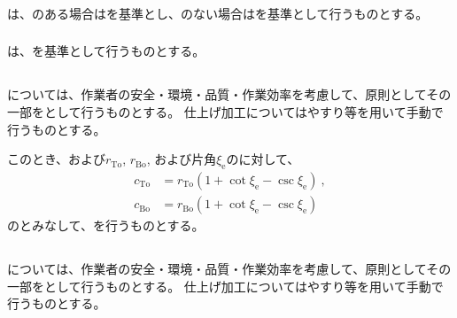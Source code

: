 \subsubsection{\EndFaceOutRChamferMillingReferencePoint}
\EndFaceOutRChamferMillingReferencePoint は、\Outcut のある場合は\OutcutCenter を基準とし、\Outcut のない場合は\EndFaceIDCenter を基準として行うものとする。

\subsubsection{\EndFaceInRChamferMilling}
\EndFaceInRChamferMillingReferencePoint は、\EndFaceIDCenter を基準として行うものとする。


\subsection{\EndFaceOutRChamferMilling}
\EndFaceOutRChamfer については、作業者の安全・環境・品質・作業効率を考慮して、原則としてその一部を\EndFaceOutCChamferMilling として行うものとする。
仕上げ加工についてはやすり等を用いて手動で行うものとする。

このとき、\TopEndFaceOutRChamferRadius および\BottomEndFaceOutRChamferRadius$r_\mathrm{To}$, $r_\mathrm{Bo}$, および片角$\xi_\mathrm e$の\TaperEndMill に対して、
\begin{align*}
  c_\mathrm{To} &= r_\mathrm{To}\left(1+\cot\xi_\mathrm e-\csc\xi_\mathrm e\right)\ ,\\
  c_\mathrm{Bo} &= r_\mathrm{Bo}\left(1+\cot\xi_\mathrm e-\csc\xi_\mathrm e\right)
\end{align*}
の\EndFaceOutCChamferLength とみなして、\EndFaceOutCChamferMilling を行うものとする。


\subsection{\EndFaceInRChamferMilling}
\EndFaceInRChamfer については、作業者の安全・環境・品質・作業効率を考慮して、原則としてその一部を\EndFaceInCChamferMilling として行うものとする。
仕上げ加工についてはやすり等を用いて手動で行うものとする。

